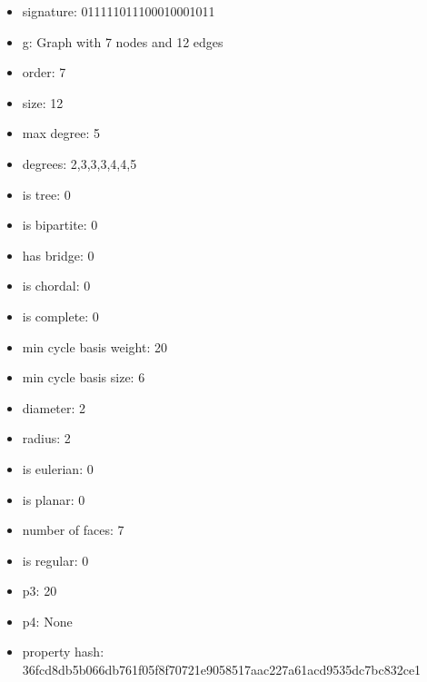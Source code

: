 \begin{itemize}
\item signature: 011111011100010001011
\item g: Graph with 7 nodes and 12 edges
\item order: 7
\item size: 12
\item max degree: 5
\item degrees: 2,3,3,3,4,4,5
\item is tree: 0
\item is bipartite: 0
\item has bridge: 0
\item is chordal: 0
\item is complete: 0
\item min cycle basis weight: 20
\item min cycle basis size: 6
\item diameter: 2
\item radius: 2
\item is eulerian: 0
\item is planar: 0
\item number of faces: 7
\item is regular: 0
\item p3: 20
\item p4: None
\item property hash: 36fcd8db5b066db761f05f8f70721e9058517aac227a61acd9535dc7bc832ce1
\end{itemize}
\newpage
\begin{figure}
\end{figure}
